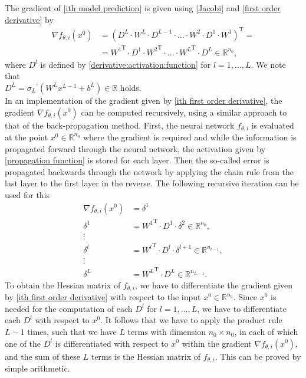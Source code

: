 The gradient of \cref{ith model prediction} is given using \cref{Jacobi} and \cref{first order derivative} by
\begin{equation} 
    \label{ith first order derivative}
    \begin{aligned}
        \nabla f_{\theta, i} \left(x^0\right) & = \left( D^L \cdot W^L \cdot D^{L-1} \cdot \ldots \cdot W^2 \cdot D^1 \cdot W^{1} \right)^{\mathrm{T}} = \\
        & = {W^{1}}^{\mathrm{T}} \cdot D^{1} \cdot {W^{2}}^{\mathrm{T}} \cdot \ldots \cdot {W^L}^{\mathrm{T}}  \cdot  D^{L} \in \mathbb{R}^{n_0}, 
    \end{aligned} 
\end{equation} 
where $D^l$ is defined by \cref{derivative:activation:function} for $l = 1, \ldots, L$. We note that \\
$D^L = {\sigma_{L}}^{\prime} \left( W^L x^{L-1} + b^L \right) \in \mathbb{R}$ holds.  \\
In an implementation of the gradient given by \cref{ith first order derivative}, the gradient $\nabla f_{\theta, i} \left(x^0\right)$ can be computed recursively, using a similar approach to that of the back-propagation method. First, the neural network $f_{\theta, i}$ is evaluated at the point $x^0 \in \mathbb{R}^{n_0}$ where the gradient is required and while the information is propagated forward through the neural network, the activation given by \cref{propagation function} is stored for each layer. Then the so-called error is propagated backwards through the network by applying the chain rule from the last layer to the first layer in the reverse. The following recursive iteration can be used for this
\begin{equation} 
    \label{gradient recursive}
    \begin{aligned}
        \nabla f_{\theta, i} \left(x^0\right) & = \delta^1 \\
        \delta^1 & = {W^{1}}^{\mathrm{T}} \cdot D^{1} \cdot \delta^2 \in \mathbb{R}^{n_0}, \\
        \vdots & \\
        \delta^l & = {W^{l}}^{\mathrm{T}} \cdot D^{l} \cdot \delta^{l+1} \in \mathbb{R}^{n_{l-1}}, \\
        \vdots & \\
        \delta^{L} & = {W^L}^{\mathrm{T}} \cdot D^{L} \in \mathbb{R}^{n_{L-1}}.
    \end{aligned} 
\end{equation} 
To obtain the Hessian matrix of $f_{\theta, i}$, we have to differentiate the gradient given by \cref{ith first order derivative} with respect to the input $x^0 \in \mathbb{R}^{n_0}$. Since $x^0$ is needed for the computation of each $D^l$ for $l = 1, \ldots, L$, we have to differentiate each $D^l$ with respect to $x^0$. It follows that we have to apply the product rule $L-1$ times, such that we have $L$ terms with dimension $n_0 \times n_0$, in each of which one of the $D^l$ is differentiated with respect to $x^0$ within the gradient $\nabla f_{\theta, i} \left(x^0\right)$, and the sum of these $L$ terms is the Hessian matrix of $f_{\theta, i}$. This can be proved by simple arithmetic. \\
